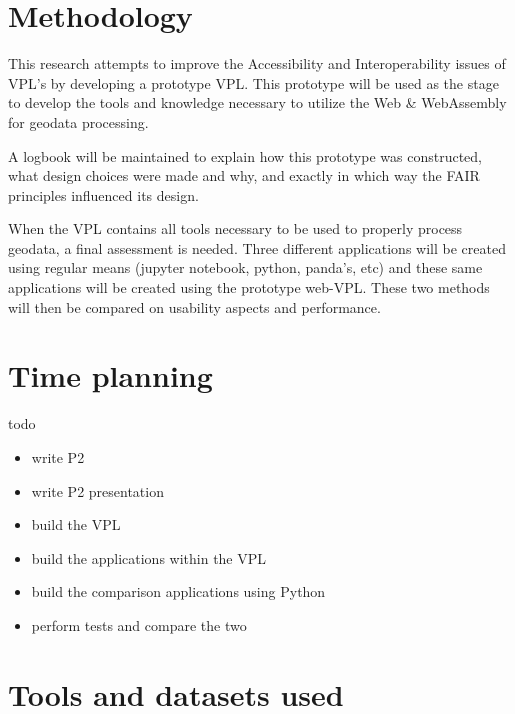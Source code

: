 \newpage
\section{Methodology}
This research attempts to improve the Accessibility and Interoperability issues of VPL's by developing a prototype VPL. 
This prototype will be used as the stage to develop the tools and knowledge necessary to utilize the Web \& WebAssembly for geodata processing.   

\par
A logbook will be maintained to explain how this prototype was constructed, what design choices were made and why, and exactly in which way the FAIR principles influenced its design. 

\par
When the VPL contains all tools necessary to be used to properly process geodata, a final assessment is needed. 
Three different applications will be created using regular means (jupyter notebook, python, panda's, etc)
and these same applications will be created using the prototype web-VPL. 
These two methods will then be compared on usability aspects and performance.   

\newpage
\section{Time planning}

todo
\begin{itemize}
    \item write P2
    \item write P2 presentation
    \item build the VPL
    \item build the applications within the VPL
    \item build the comparison applications using Python
    \item perform tests and compare the two
\end{itemize}






\newpage
\section{Tools and datasets used}

